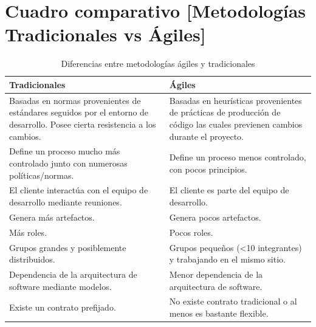 \section{Cuadro comparativo [Metodologías Tradicionales vs Ágiles]} 

\begin{table}[H]	
\begin{center}
\begin{tabular}{ | m{6cm} | m{6cm} | } 
 \hline
 Tradicionales & Ágiles \\ 
	\hline
	Basadas en normas provenientes de estándares seguidos por el entorno de desarrollo.  Posee cierta resistencia a los cambios. 
	&
	Basadas en heurísticas provenientes de prácticas de producción de código las cuales previenen cambios durante el proyecto.\\ 
 	\hline
 	Define un proceso mucho más controlado junto con numerosas políticas/normas.
	&
	Define un proceso menos controlado, con pocos principios.\\ 
	\hline
	El cliente interactúa con el equipo de desarrollo mediante reuniones.	
	&
	El cliente es parte del equipo de desarrollo. \\ 
	\hline
	Genera más artefactos.	
	&
	Genera pocos artefactos.\\ 
	\hline

	Más roles.	
	&
	Pocos roles.\\ 
	\hline

	Grupos grandes y posiblemente distribuidos.	
	&
	Grupos pequeños (<10 integrantes) y trabajando en el mismo sitio.\\ 
	\hline

	Dependencia de la arquitectura de software mediante modelos.	
	& 
	Menor dependencia de la arquitectura de software.\\ 
	\hline

	Existe un contrato prefijado.	
	&
	No existe contrato tradicional o al menos es bastante flexible.\\ 
	\hline

\end{tabular}
\caption{Diferencias entre metodologías ágiles y tradicionales}
\label{Tabla:3}
\end{center}
\end{table}	


